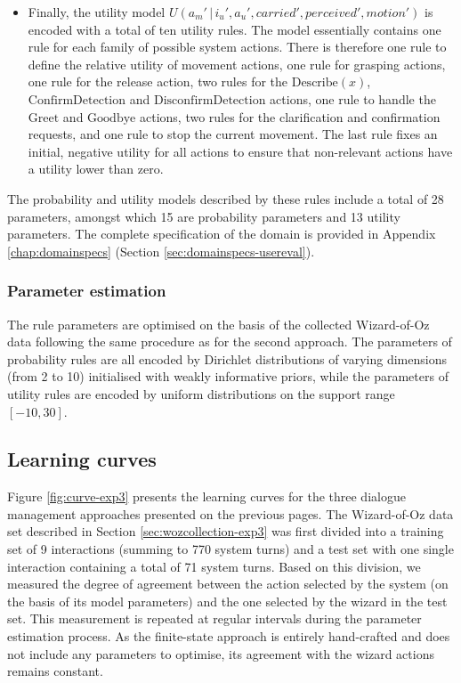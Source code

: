 \begin{itemize}
\item Finally, the utility model $U(a_m' \, | \, i_u', a_u', \mathit{carried'}, \mathit{perceived'}, \mathit{motion'})$ is encoded with a total of ten utility rules.  The model essentially contains one rule for each family of possible system actions.  There is therefore one rule to define the relative utility of movement actions, one rule for grasping actions, one rule for the release action, two rules for the $\mathrm{Describe(\mathit{x})}$, $\mathrm{ConfirmDetection}$ and $\mathrm{DisconfirmDetection}$ actions, one rule to handle the  $\mathrm{Greet}$ and $\mathrm{Goodbye}$ actions, two rules for the clarification and confirmation requests, and one rule to stop the current movement. The last rule fixes an initial, negative utility for all actions to ensure that non-relevant actions have a utility lower than zero.  

\end{itemize}

The probability and utility models described by these rules include a total of 28 parameters, amongst which 15 are probability parameters and 13 utility parameters.  The complete specification of the domain is provided in Appendix \ref{chap:domainspecs} (Section \ref{sec:domainspecs-usereval}). 

\subsubsection*{Parameter estimation}

The rule parameters are optimised on the basis of the collected Wizard-of-Oz data following the same procedure as for the second approach.  The parameters of probability rules are all encoded by Dirichlet distributions of varying dimensions (from 2 to 10) initialised with weakly informative priors, while the parameters of utility rules are encoded by uniform distributions on the support range $[-10, 30]$.  


\subsection{Learning curves}
\label{sec:learningcurve-exp3}

Figure \ref{fig:curve-exp3} presents the learning curves for the three dialogue management approaches presented on the previous pages. The Wizard-of-Oz data set described in Section \ref{sec:wozcollection-exp3} was first divided into a training set of 9 interactions (summing to 770 system turns) and a test set with one single interaction containing a total of 71 system turns. Based on this division, we measured the degree of agreement between the action selected by the system (on the basis of its model parameters) and the one selected by the wizard in the test set. This measurement is repeated at regular intervals during the parameter estimation process.  As the finite-state approach is entirely hand-crafted and does not include any parameters to optimise, its agreement with the wizard actions remains constant.


